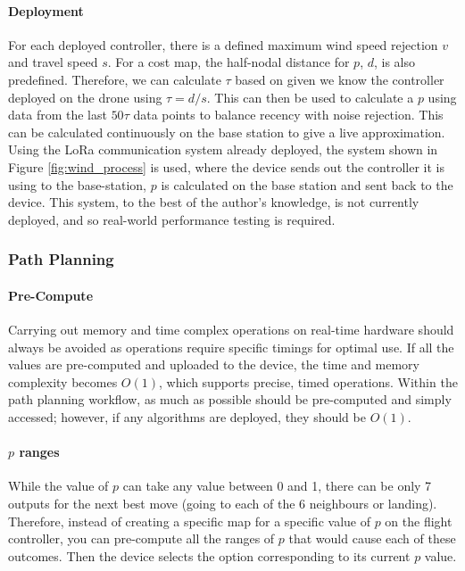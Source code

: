 \paragraph{Deployment}
For each deployed controller, there is a defined maximum wind speed rejection $v$ and travel speed $s$. For a cost map, the half-nodal distance for $p$, $d$, is also predefined. Therefore, we can calculate $\tau$ based on given we know the controller deployed on the drone using $\tau = d/s$. This can then be used to calculate a $p$ using data from the last $50\tau$ data points to balance recency with noise rejection. This can be calculated continuously on the base station to give a live approximation. Using the LoRa communication system already deployed, the system shown in Figure \ref{fig:wind_process} is used, where the device sends out the controller it is using to the base-station, $p$ is calculated on the base station and sent back to the device. This system, to the best of the author's knowledge, is not currently deployed, and so real-world performance testing is required.


\subsubsection{Path Planning}\label{sub_sub_section:tgt_search}
%

\paragraph{Pre-Compute}
Carrying out memory and time complex operations on real-time hardware should always be avoided as operations require specific timings for optimal use. If all the values are pre-computed and uploaded to the device, the time and memory complexity becomes $O(1)$, which supports precise, timed operations. Within the path planning workflow, as much as possible should be pre-computed and simply accessed; however, if any algorithms are deployed, they should be $O(1)$.
\paragraph{$p$ ranges}
While the value of $p$ can take any value between 0 and 1, there can be only 7 outputs for the next best move (going to each of the 6 neighbours or landing). Therefore, instead of creating a specific map for a specific value of $p$ on the flight controller, you can pre-compute all the ranges of $p$ that would cause each of these outcomes. Then the device selects the option corresponding to its current $p$ value.
